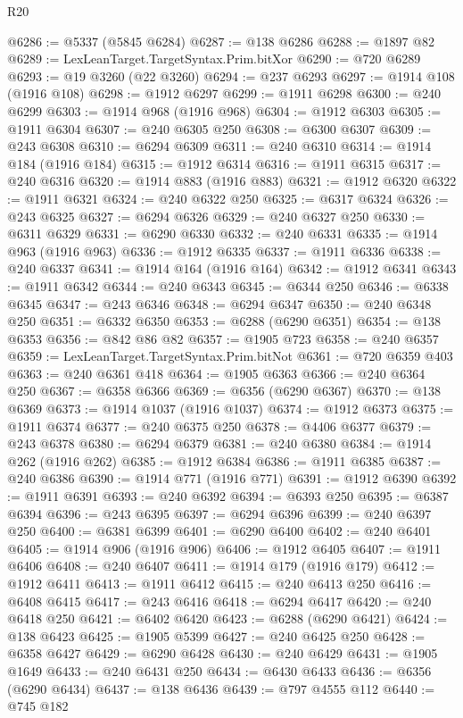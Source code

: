 \begin{lexlean}{R20}
\begin{coremodule}
{@6286 := @5337 (@5845 @6284)
@6287 := @138 @6286
@6288 := @1897 @82
@6289 := LexLeanTarget.TargetSyntax.Prim.bitXor
@6290 := @720 @6289
@6293 := @19 @3260 (@22 @3260)
@6294 := @237 @6293
@6297 := @1914 @108 (@1916 @108)
@6298 := @1912 @6297
@6299 := @1911 @6298
@6300 := @240 @6299
@6303 := @1914 @968 (@1916 @968)
@6304 := @1912 @6303
@6305 := @1911 @6304
@6307 := @240 @6305 @250
@6308 := @6300 @6307
@6309 := @243 @6308
@6310 := @6294 @6309
@6311 := @240 @6310
@6314 := @1914 @184 (@1916 @184)
@6315 := @1912 @6314
@6316 := @1911 @6315
@6317 := @240 @6316
@6320 := @1914 @883 (@1916 @883)
@6321 := @1912 @6320
@6322 := @1911 @6321
@6324 := @240 @6322 @250
@6325 := @6317 @6324
@6326 := @243 @6325
@6327 := @6294 @6326
@6329 := @240 @6327 @250
@6330 := @6311 @6329
@6331 := @6290 @6330
@6332 := @240 @6331
@6335 := @1914 @963 (@1916 @963)
@6336 := @1912 @6335
@6337 := @1911 @6336
@6338 := @240 @6337
@6341 := @1914 @164 (@1916 @164)
@6342 := @1912 @6341
@6343 := @1911 @6342
@6344 := @240 @6343
@6345 := @6344 @250
@6346 := @6338 @6345
@6347 := @243 @6346
@6348 := @6294 @6347
@6350 := @240 @6348 @250
@6351 := @6332 @6350
@6353 := @6288 (@6290 @6351)
@6354 := @138 @6353
@6356 := @842 @86 @82
@6357 := @1905 @723
@6358 := @240 @6357
@6359 := LexLeanTarget.TargetSyntax.Prim.bitNot
@6361 := @720 @6359 @403
@6363 := @240 @6361 @418
@6364 := @1905 @6363
@6366 := @240 @6364 @250
@6367 := @6358 @6366
@6369 := @6356 (@6290 @6367)
@6370 := @138 @6369
@6373 := @1914 @1037 (@1916 @1037)
@6374 := @1912 @6373
@6375 := @1911 @6374
@6377 := @240 @6375 @250
@6378 := @4406 @6377
@6379 := @243 @6378
@6380 := @6294 @6379
@6381 := @240 @6380
@6384 := @1914 @262 (@1916 @262)
@6385 := @1912 @6384
@6386 := @1911 @6385
@6387 := @240 @6386
@6390 := @1914 @771 (@1916 @771)
@6391 := @1912 @6390
@6392 := @1911 @6391
@6393 := @240 @6392
@6394 := @6393 @250
@6395 := @6387 @6394
@6396 := @243 @6395
@6397 := @6294 @6396
@6399 := @240 @6397 @250
@6400 := @6381 @6399
@6401 := @6290 @6400
@6402 := @240 @6401
@6405 := @1914 @906 (@1916 @906)
@6406 := @1912 @6405
@6407 := @1911 @6406
@6408 := @240 @6407
@6411 := @1914 @179 (@1916 @179)
@6412 := @1912 @6411
@6413 := @1911 @6412
@6415 := @240 @6413 @250
@6416 := @6408 @6415
@6417 := @243 @6416
@6418 := @6294 @6417
@6420 := @240 @6418 @250
@6421 := @6402 @6420
@6423 := @6288 (@6290 @6421)
@6424 := @138 @6423
@6425 := @1905 @5399
@6427 := @240 @6425 @250
@6428 := @6358 @6427
@6429 := @6290 @6428
@6430 := @240 @6429
@6431 := @1905 @1649
@6433 := @240 @6431 @250
@6434 := @6430 @6433
@6436 := @6356 (@6290 @6434)
@6437 := @138 @6436
@6439 := @797 @4555 @112
@6440 := @745 @182
}
\end{coremodule}
\end{lexlean}
